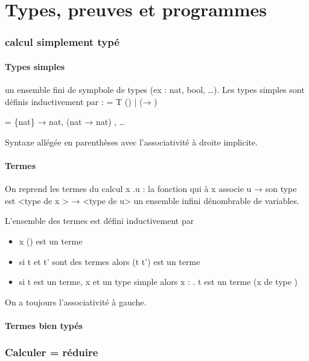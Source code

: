 \documentclass[10pt,a4paper]{article}
\newcommand{\Vs}{\mathbb{V}}
\newcommand{\T}{\mathcal{T}}
\begin{document}
\part{Types, preuves et programmes}

\section{\lambda calcul simplement typé}

\subsection{Types simples}

\T un ensemble fini de sympbole de types (ex : nat, bool, \dots). Les types simples sont définis inductivement par 
\tau : = T (\in \T) | (\tau → \tau)


\begin{ex}
 \T = \{nat\} → nat, (nat → nat) , \dots
\end{ex}
Syntaxe allégée en parenthèses avec l'associativité à droite implicite.

\subsection{Termes}

On reprend les termes du \lambda calcul
\lambda x .u : la fonction qui à x associe u 
→ son type est <type de x > → <type de u>
\Vs un ensemble infini dénombrable de variables.

\begin{definition}
 L'ensemble des termes est défini inductivement par 
\begin{itemize}
 \item x (\in \Vs) est un terme
 \item si t et t' sont des termes alors (t t') est un terme
 \item si t est un terme, x \in \Vs et \tau un type simple alors 
	\lambda x : \tau . t est un terme (x de type  \tau)
\end{itemize}
On a toujours l'associativité à gauche.
\end{definition}
 

\subsection{Termes bien typés}

\section{Calculer = réduire}
\end{document}
